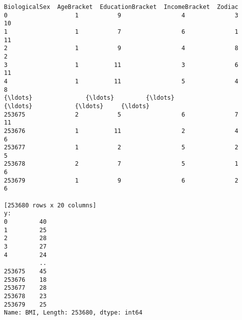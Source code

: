 \documentclass[11pt]{article}
\begin{document}
\begin{Verbatim}[commandchars=\\\{\}]
        BiologicalSex  AgeBracket  EducationBracket  IncomeBracket  Zodiac
0                   1           9                 4              3      10
1                   1           7                 6              1      11
2                   1           9                 4              8       2
3                   1          11                 3              6      11
4                   1          11                 5              4       8
{\ldots}               {\ldots}         {\ldots}               {\ldots}            {\ldots}     {\ldots}
253675              2           5                 6              7      11
253676              1          11                 2              4       6
253677              1           2                 5              2       5
253678              2           7                 5              1       6
253679              1           9                 6              2       6

[253680 rows x 20 columns]
y:
0         40
1         25
2         28
3         27
4         24
          ..
253675    45
253676    18
253677    28
253678    23
253679    25
Name: BMI, Length: 253680, dtype: int64
    \end{Verbatim}
\end{document}
